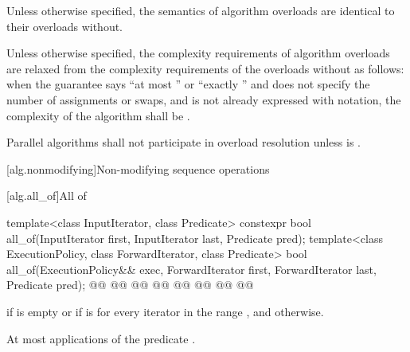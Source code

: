 \pnum
Unless otherwise specified, the semantics of  algorithm
overloads are identical to their overloads without.

\pnum
Unless otherwise specified, the complexity requirements of 
algorithm overloads are relaxed from the complexity requirements of the overloads
without as follows:
when the guarantee says ``at most '' or ``exactly ''
and does not specify the number of assignments or swaps, and 
is not already expressed with  \bigoh{} notation, the complexity of the algorithm
shall be .

\pnum
Parallel algorithms shall not participate in overload resolution unless
 is .

[alg.nonmodifying]{Non-modifying sequence operations}

[alg.all_of]{All of}

%
\begin{itemdecl}
template<class InputIterator, class Predicate>
  constexpr bool all_of(InputIterator first, InputIterator last, Predicate pred);
template<class ExecutionPolicy, class ForwardIterator, class Predicate>
  bool all_of(ExecutionPolicy&& exec, ForwardIterator first, ForwardIterator last,
              Predicate pred);
@@
  @@
            @@
    @@
  @@
            @@
    @@
@\added{\}}@
\end{itemdecl}

\begin{itemdescr}
\pnum
\returns {} if  is empty or if
 is  for every
iterator  in the range , and 
otherwise.

\pnum
\complexity At most  applications of the predicate
.
\end{itemdescr}

